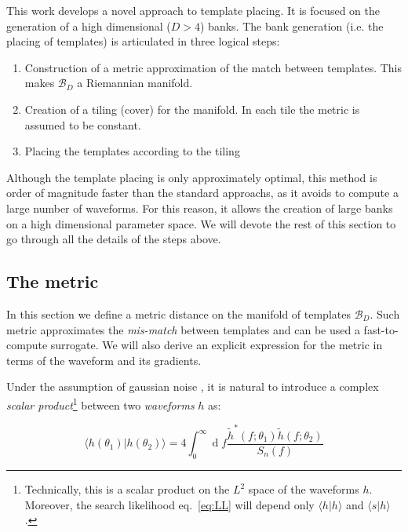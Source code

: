 \documentclass[twocolumn,showpacs,preprintnumbers,nofootinbib,prd,
superscriptaddress,10pt]{revtex4-2}
\renewcommand{\d}[1]{\ensuremath{\operatorname{d}\!{#1}}}
\newcommand{\scalar}[2]{\langle #1|#2 \rangle}
\begin{document}
This work develops a novel approach to template placing. It is focused on the generation of a high dimensional ($D>4$) banks.
The bank generation (i.e. the placing of templates) is articulated in three logical steps:

\begin{enumerate}
	\item Construction of a metric approximation of the match between templates. This makes $\mathcal{B}_D$ a Riemannian manifold.
	\item Creation of a tiling (cover) for the manifold. In each tile the metric is assumed to be constant.
	\item Placing the templates according to the tiling
\end{enumerate}

Although the template placing is only approximately optimal, this method is order of magnitude faster than the standard approachs, as it avoids to compute a large number of waveforms. For this reason, it allows the creation of large banks on a high dimensional parameter space.
We will devote the rest of this section to go through all the details of the steps above.

\subsection{The metric} \label{sec:metric}

In this section we define a metric distance on the manifold of templates $\mathcal{B}_D$. Such metric approximates the {\it mis-match} between templates and can be used a fast-to-compute surrogate. We will also derive an explicit expression for the metric in terms of the waveform and its gradients.

Under the assumption of gaussian noise \cite{Creighton_book}, it is natural to introduce a complex \textit{scalar product}\footnote{
Technically, this is a scalar product on the $L^2$ space of the waveforms $h$.
Moreover, the search likelihood eq.~\eqref{eq:LL} will depend only $\scalar{h}{h}$ and $\scalar{s}{h}$.
} between two \textit{waveforms} $h$ as:

\begin{equation} \label{eq:scalar_product}
	\scalar{h(\theta_1)}{h(\theta_2)} = 4 \int_{0}^{\infty} \d{f} \frac{\tilde{h}^*(f;\theta_1) \tilde{h}(f;\theta_2)}{S_n(f)}
\end{equation}
\end{document}
